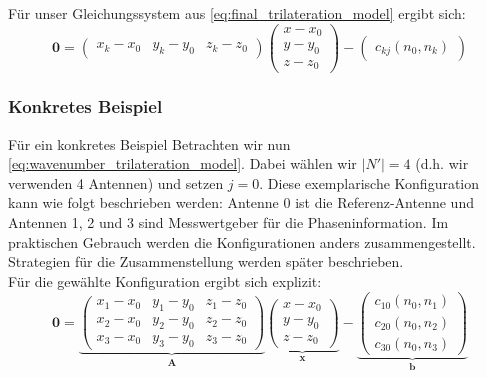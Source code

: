 {%
Für unser Gleichungssystem aus \eqref{eq:final_trilateration_model} ergibt sich:
%
\begin{equation}\label{eq:wavenumber_trilateration_model}
\mathbf{0}=
\left(
	\begin{array}{ccc}
		x_k-x_0 & y_k-y_0 & z_k-z_0 
	\end{array}
\right)
\left(
   \begin{array}{c}
	   x-x_0\\
	   y-y_0\\
	   z-z_0
   \end{array}
\right)
-
\left(
	\begin{array}{c}
		c_{kj}(n_0, n_k)
	\end{array}
\right)
\end{equation}
%
\subsubsection{Konkretes Beispiel}
%
Für ein konkretes Beispiel Betrachten wir nun \eqref{eq:wavenumber_trilateration_model}. Dabei wählen wir $|N'|=4$ (d.h. wir verwenden 4 Antennen) und setzen $j=0$. Diese exemplarische Konfiguration kann wie folgt beschrieben werden: Antenne 0 ist die Referenz-Antenne und Antennen 1, 2 und 3 sind Messwertgeber für die Phaseninformation. Im praktischen Gebrauch werden die Konfigurationen anders zusammengestellt. Strategien für die Zusammenstellung werden später beschrieben.\\
Für die gewählte Konfiguration ergibt sich explizit:
%
\begin{equation}\label{eq:wavenumber_trilateration_model_explicit}
\mathbf{0}=
\underbrace{\left(
	\begin{array}{ccc}
		x_1-x_0 & y_1-y_0 & z_1-z_0 \\
		x_2-x_0 & y_2-y_0 & z_2-z_0 \\
		x_3-x_0 & y_3-y_0 & z_3-z_0 
	\end{array}
\right)}_{\textbf{A}}
\underbrace{\left(
   \begin{array}{c}
	   x-x_0\\
	   y-y_0\\
	   z-z_0
   \end{array}
\right)}_{\textbf{x}}
-
\underbrace{\left(
	\begin{array}{c}
		c_{10}(n_0, n_1) \\
		c_{20}(n_0, n_2) \\
		c_{30}(n_0, n_3)
	\end{array}
\right)}_{\textbf{b}}
\end{equation}
}
